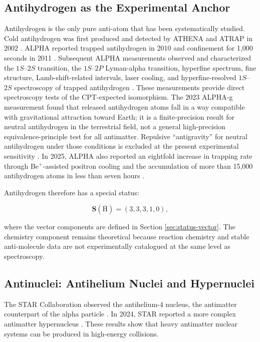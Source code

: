 \documentclass[11pt,a4paper]{article}
\newcommand{\antiH}{\ensuremath{\overline{\mathrm{H}}}}
\begin{document}
\subsection{Antihydrogen as the Experimental Anchor}

Antihydrogen is the only pure anti-atom that has been systematically studied. Cold antihydrogen was first produced and detected by ATHENA and ATRAP in 2002 \cite{ATHENA2002,ATRAP2002}. ALPHA reported trapped antihydrogen in 2010 and confinement for 1,000 seconds in 2011 \cite{Andresen2010,Andresen2011}. Subsequent ALPHA measurements observed and characterized the $1S$--$2S$ transition, the $1S$--$2P$ Lyman-alpha transition, hyperfine spectrum, fine structure, Lamb-shift-related intervals, laser cooling, and hyperfine-resolved $1S$--$2S$ spectroscopy of trapped antihydrogen \cite{ALPHA2017,Ahmadi2017Hyperfine,ALPHA2018,ALPHA2018Lyman,ALPHA2020Fine,Baker2021Cooling,ALPHA2025Hyperfine}. These measurements provide direct spectroscopy tests of the CPT-expected isomorphism. The 2023 ALPHA-g measurement found that released antihydrogen atoms fall in a way compatible with gravitational attraction toward Earth; it is a finite-precision result for neutral antihydrogen in the terrestrial field, not a general high-precision equivalence-principle test for all antimatter. Repulsive \enquote{antigravity} for neutral antihydrogen under those conditions is excluded at the present experimental sensitivity \cite{Anderson2023}. In 2025, ALPHA also reported an eightfold increase in trapping rate through Be$^{+}$-assisted positron cooling and the accumulation of more than 15,000 antihydrogen atoms in less than seven hours \cite{Akbari2025}.

Antihydrogen therefore has a special status:

\begin{equation}
\mathbf{S}(\antiH)=(3,3,3,1,0),
\end{equation}

where the vector components are defined in Section \ref{sec:status-vector}. The chemistry component remains theoretical because reaction chemistry and stable anti-molecule data are not experimentally catalogued at the same level as spectroscopy.

\subsection{Antinuclei: Antihelium Nuclei and Hypernuclei}

The STAR Collaboration observed the antihelium-4 nucleus, the antimatter counterpart of the alpha particle \cite{STAR2011}. In 2024, STAR reported a more complex antimatter hypernucleus \cite{STAR2024}. These results show that heavy antimatter nuclear systems can be produced in high-energy collisions.
\end{document}
